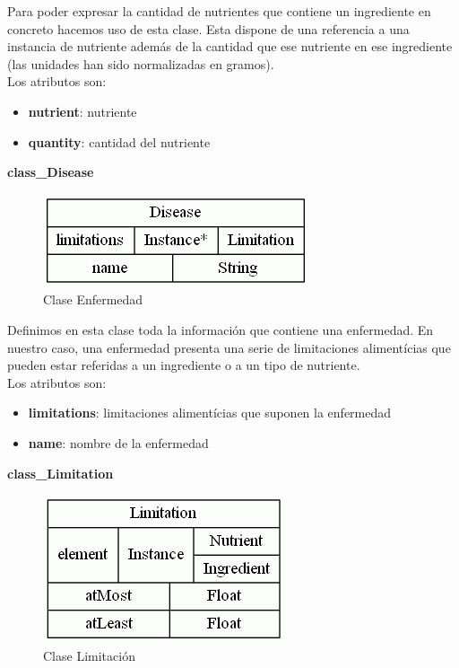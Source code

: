 \documentclass[12]{article}
\begin{document}
Para poder expresar la cantidad de nutrientes que contiene un ingrediente en concreto hacemos uso de esta clase. Esta dispone de una referencia a una instancia de nutriente además de la cantidad que ese nutriente en ese ingrediente (las unidades han sido normalizadas en gramos). 
\\

Los atributos son: 
\begin{itemize}
\item \textbf{nutrient}: nutriente
\item \textbf{quantity}: cantidad del nutriente
\end{itemize}


\vspace{0.5cm}

\textbf{class\_Disease}
\begin{figure}[H]
\centering
\includegraphics[scale=0.5]{images/classDisease.png}
\caption{Clase Enfermedad}
\label{enfermedad}
\end{figure}

Definimos en esta clase toda la información que contiene una enfermedad. En nuestro caso, una enfermedad presenta una serie de limitaciones alimentícias que pueden estar referidas a un ingrediente o a un tipo de nutriente. 
\\

Los atributos son: 
\begin{itemize}
\item \textbf{limitations}: limitaciones alimentícias que suponen la enfermedad
\item \textbf{name}: nombre de la enfermedad
\end{itemize}

\vspace{0.5cm}

\textbf{class\_Limitation}
\begin{figure}[H]
\centering
\includegraphics[scale=0.5]{images/classLimitation.png}
\caption{Clase Limitación}
\label{limitacion}
\end{figure}
\end{document}
